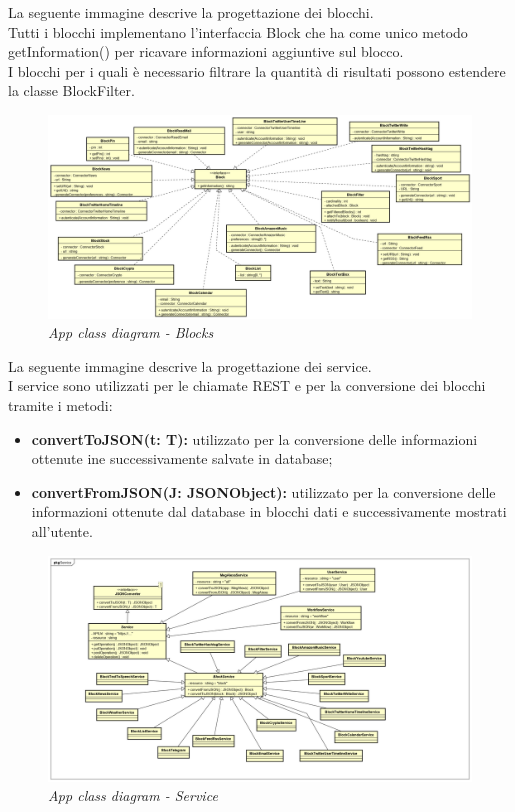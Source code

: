 \newpage
La seguente immagine descrive la progettazione dei blocchi. \\
Tutti i blocchi implementano l'interfaccia Block che ha come unico metodo getInformation() per ricavare informazioni aggiuntive sul blocco. \\
I blocchi per i quali è necessario filtrare la quantità di risultati possono estendere la classe BlockFilter.
\begin{figure} [H]
	\centering
	\includegraphics[scale=0.3]{./images/Blocks.png}
	\caption{\textit{App class diagram - Blocks}}\label{Blocks}
\end{figure}
\newpage
La seguente immagine descrive la progettazione dei service. \\
I service sono utilizzati per le chiamate REST e per la conversione dei blocchi tramite i metodi:
\begin{itemize}
	\item \textbf{convertToJSON(t: T):} utilizzato per la conversione delle informazioni ottenute ine successivamente salvate in database;
	\item \textbf{convertFromJSON(J: JSONObject):} utilizzato per la conversione delle informazioni ottenute dal database in blocchi dati e successivamente mostrati all'utente. 
\end{itemize}
\begin{figure} [H]
	\centering
	\includegraphics[scale=0.3]{./images/Service.png}
	\caption{\textit{App class diagram - Service}}\label{Service}
\end{figure}
